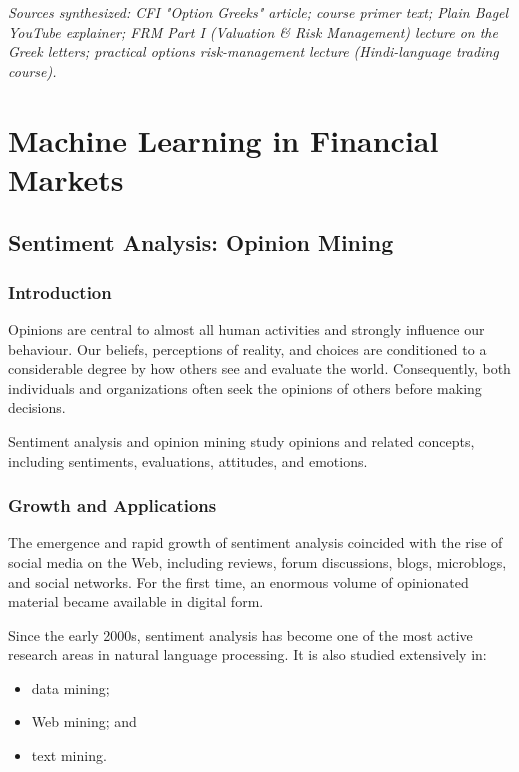 \documentclass[12pt,openany]{book}
\theoremstyle{definition}
\theoremstyle{remark}
\begin{document}
\emph{Sources synthesized: CFI "Option Greeks" article; course primer text; Plain Bagel YouTube explainer; FRM Part I (Valuation \& Risk Management) lecture on the Greek letters; practical options risk-management lecture (Hindi-language trading course).}

\part*{Machine Learning in Financial Markets}

\chapter{Sentiment Analysis: Opinion Mining}

\section{Introduction}

Opinions are central to almost all human activities and strongly influence
our behaviour. Our beliefs, perceptions of reality, and choices are
conditioned to a considerable degree by how others see and evaluate the
world. Consequently, both individuals and organizations often seek the
opinions of others before making decisions.

Sentiment analysis and opinion mining study opinions and related concepts,
including sentiments, evaluations, attitudes, and emotions.

\section{Growth and Applications}

The emergence and rapid growth of sentiment analysis coincided with the rise
of social media on the Web, including reviews, forum discussions, blogs,
microblogs, and social networks. For the first time, an enormous volume of
opinionated material became available in digital form.

Since the early 2000s, sentiment analysis has become one of the most active
research areas in natural language processing. It is also studied extensively
in:

\begin{itemize}
    \item data mining;
    \item Web mining; and
    \item text mining.
\end{itemize}
\end{document}
